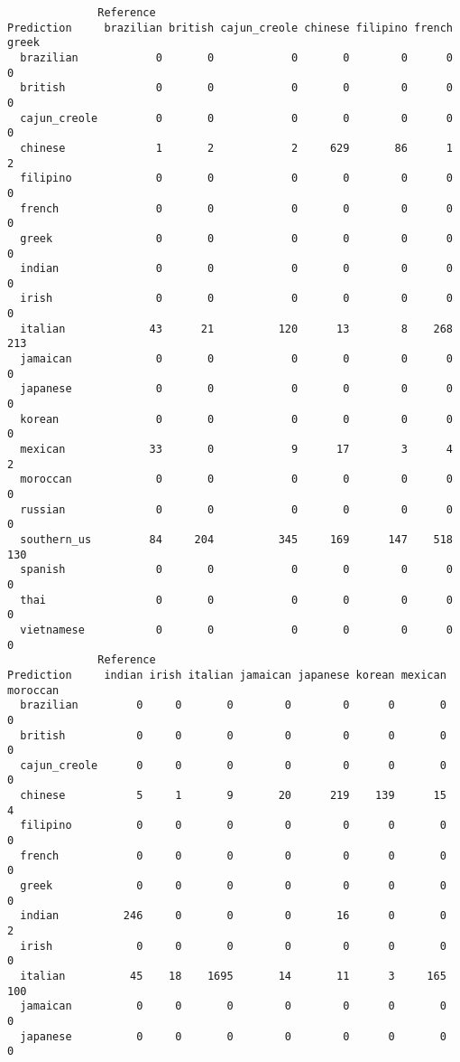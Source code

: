 \documentclass{article}
\begin{document}
\begin{verbatim}
              Reference
Prediction     brazilian british cajun_creole chinese filipino french greek
  brazilian            0       0            0       0        0      0     0
  british              0       0            0       0        0      0     0
  cajun_creole         0       0            0       0        0      0     0
  chinese              1       2            2     629       86      1     2
  filipino             0       0            0       0        0      0     0
  french               0       0            0       0        0      0     0
  greek                0       0            0       0        0      0     0
  indian               0       0            0       0        0      0     0
  irish                0       0            0       0        0      0     0
  italian             43      21          120      13        8    268   213
  jamaican             0       0            0       0        0      0     0
  japanese             0       0            0       0        0      0     0
  korean               0       0            0       0        0      0     0
  mexican             33       0            9      17        3      4     2
  moroccan             0       0            0       0        0      0     0
  russian              0       0            0       0        0      0     0
  southern_us         84     204          345     169      147    518   130
  spanish              0       0            0       0        0      0     0
  thai                 0       0            0       0        0      0     0
  vietnamese           0       0            0       0        0      0     0
              Reference
Prediction     indian irish italian jamaican japanese korean mexican moroccan
  brazilian         0     0       0        0        0      0       0        0
  british           0     0       0        0        0      0       0        0
  cajun_creole      0     0       0        0        0      0       0        0
  chinese           5     1       9       20      219    139      15        4
  filipino          0     0       0        0        0      0       0        0
  french            0     0       0        0        0      0       0        0
  greek             0     0       0        0        0      0       0        0
  indian          246     0       0        0       16      0       0        2
  irish             0     0       0        0        0      0       0        0
  italian          45    18    1695       14       11      3     165      100
  jamaican          0     0       0        0        0      0       0        0
  japanese          0     0       0        0        0      0       0        0

\end{verbatim}
\end{document}
